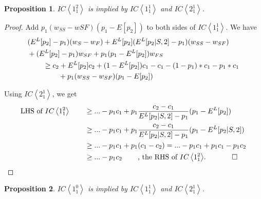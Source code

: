 \documentclass[11pt]{article} %
\theoremstyle{exampstyle}
\newtheorem*{proposition*}{Proposition}
\newcommand{\eq}[1]{\begin{align}#1\end{align}}
\newcommand{\la}{ \left < }
\newcommand{\ra}{ \right > }
\begin{document}
\begin{proposition*}

$IC \la 1^2_1 \ra$ is implied by $IC \la 1^1_1 \ra$ and $IC \la 2^1_1 \ra$.  

\end{proposition*}

\begin{proof}

Add $p_1(w_{SS}-w{SF})(p_1-E[p_2])$ to both sides of $IC \la 1^1_1 \ra$.
We have 
\eq{
&(E^L[p_2]-p_1)(w_S-w_F) + E^L[p_2]( E^L[p_2 | S,2] - p_1 )( w_{SS} -w_{SF} ) \notag \\
&+(E^L[p_2]-p_1) w_{SF} + p_1 (p_1-E^L[p_2]) w_{FS} \notag \\
&\hspace{.3in}  \ge c_2 + E^L[p_2] c_2 + (1-E^L[p_2]) c_1 -  c_1 -(1-p_1)*c_1 -p_1*c_1  \notag \\
&\hspace{.6in}  +p_1(w_{SS}-w_{SF})(p_1-E[p_2]) \notag 
}

Using $IC \la 2^1_1 \ra$, we get
\eq{
\text{LHS of $IC \la 1^2_1 \ra$} \hspace{.3in}  &\ge ... - p_1 c_1 + p_1\frac{c_2-c_1}{E^L[p_2|S,2]-p_1} (p_1-E^L[p_2]) 	\notag \\
&\ge ... -p_1 c_1  + p_1\frac{c_2-c_1}{E^L[p_2|S,2]-p_1} (p_1-E^L[p_2|S,2]) \notag \\
& \ge ... -p_1 c_1 + p_1 (c_1 - c_2) = ... -p_1c_1 +p_1 c_1 - p_1 c_2 \notag \\
& \ge ... - p_1 c_2 \hspace{.3in} \text{, the RHS of $IC \la 1^2_1 \ra$.}  \notag \hspace{.5in} \square
}

\end{proof}


\begin{proposition*}

$IC \la 1^0_1 \ra$ is implied by $IC \la 1^1_1 \ra$ and $IC \la 2^1_1 \ra$.  

\end{proposition*}
\end{document}
